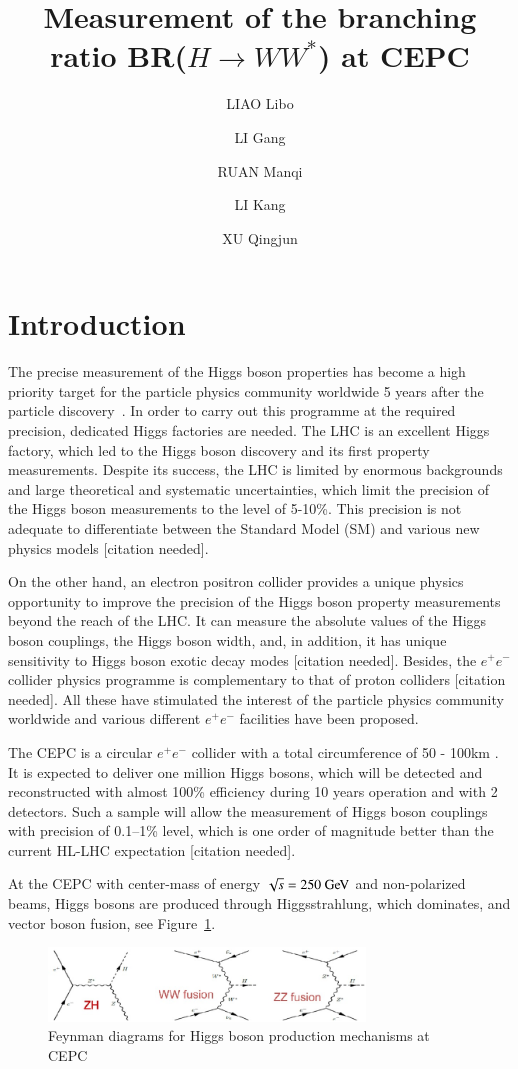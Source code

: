 \documentclass[11pt,a4paper]{cepcnote}
\title{ Measurement of the branching ratio BR($H\rightarrow WW^*$) at CEPC }
\author[a,b]{LIAO Libo}
\author[b]{LI Gang}
\author[b]{RUAN Manqi}
\author[a]{LI Kang}
\author[a]{XU Qingjun}
\affil[a]{Hangzhou Normal University}
\affil[b]{Institute of High Energy Physics}
\begin{document}
\tableofcontents
\clearpage

\section{Introduction}
The precise measurement of the Higgs boson properties has become a high priority target for the particle physics community worldwide 5 years after the particle discovery~\cite{wwnote}. In order to carry out this programme
at the required precision, dedicated Higgs factories are needed.
The LHC is an excellent Higgs factory, which led to the Higgs boson discovery
and its first property measurements. Despite its success, the LHC is limited 
by enormous backgrounds and large theoretical and systematic uncertainties, 
which limit the precision of the Higgs boson measurements to the level of
5-10\%. This precision is not adequate to differentiate between the 
Standard Model (SM) and various new physics models {\color{red}[citation needed]}.

On the other hand, an electron positron collider provides a unique physics 
opportunity to improve the precision of the Higgs boson property measurements 
beyond the reach of the LHC. It can measure the absolute values of the Higgs 
boson couplings, the Higgs boson width, and, in addition, it has unique 
sensitivity to Higgs boson exotic decay modes {\color{red}[citation needed]}. Besides, the $e^+e^-$ collider 
physics programme is complementary to that of proton colliders {\color{red}[citation needed]}. All these have
stimulated the interest of the particle physics community worldwide and
various different $e^+e^-$ facilities have been proposed. 

The CEPC is a circular $e^+e^-$ collider with a total circumference of 50 - 100km \cite{precdr}. It is expected to deliver one million 
Higgs bosons, which will be detected and reconstructed with almost 100\% efficiency during 10 years operation and with 2 detectors. Such a sample will  
allow the measurement of Higgs boson couplings with precision of 0.1--1\% level, which is one order of magnitude better than the current HL-LHC expectation {\color{red}[citation needed]}. 

At the CEPC with center-mass of energy $\sqrt s = 250\gev$ and 
non-polarized beams, Higgs bosons are produced through  Higgsstrahlung, 
which dominates, and vector boson fusion, see  Figure~\ref{fig:fmd}.
\begin{figure}[H]
\begin{center}
\includegraphics[width=0.75\textwidth]{FMD}
\caption[]{Feynman diagrams for Higgs boson production mechanisms at CEPC}
\label{fig:fmd}
\end{center}
\end{figure}
\end{document}

